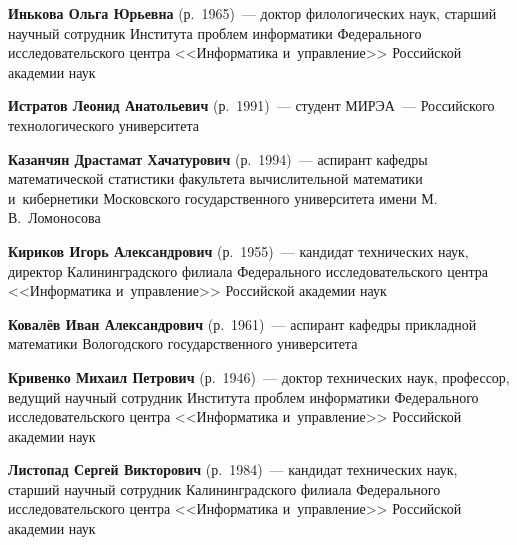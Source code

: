 \begin{multicols}{2}
\vspace*{3pt}




   \vspace*{3pt}
   
\noindent
\textbf{Инькова Ольга Юрьевна} (р.\ 1965)~--- 
доктор филологических наук, старший научный сотрудник Института проб\-лем 
информатики Федерального исследовательского цент\-ра <<Информатика и~управ\-ле\-ние>> Российской академии наук

   
   \pagebreak

\noindent
\textbf{Истратов Леонид Анатольевич} (р.\ 1991)~--- студент МИРЭА~--- 
Российского технологического университета

   \vspace*{3pt}
   


\noindent
\textbf{Казанчян Драстамат Хачатурович} (р.\ 1994)~--- аспирант кафедры 
математической статистики факультета вычислительной математики и~кибернетики 
Московского государственного университета имени М.\,В.~Ломоносова

   \vspace*{3pt}
   
   \noindent
\textbf{Кириков Игорь Александрович} (р.\ 1955)~--- 
кандидат технических наук, директор Калининградского филиала Федерального исследовательского цент\-ра 
<<Информатика и~управ\-ле\-ние>> Российской академии наук

\vspace*{3pt}

\noindent
\textbf{Ковалёв Иван Александрович} (р.\ 1961)~--- 
аспирант кафедры прикладной математики Вологодского государственного университета

\vspace*{3pt}

   
\noindent
\textbf{Кривенко Михаил Петрович} (р.\ 1946)~--- 
доктор технических наук, профессор, ведущий научный сотруд\-ник Института проб\-лем 
информатики Федерального исследовательского центра <<Информатика и~управ\-ле\-ние>> Российской академии наук

\vspace*{3pt}

\noindent
\textbf{Листопад Сергей Викторович} (р.\ 1984)~--- кандидат технических наук, 
старший научный со\-труд\-ник Калининградского филиала Федерального исследовательского цент\-ра 
<<Информатика и~управ\-ле\-ние>> Российской академии наук


\end{multicols}
